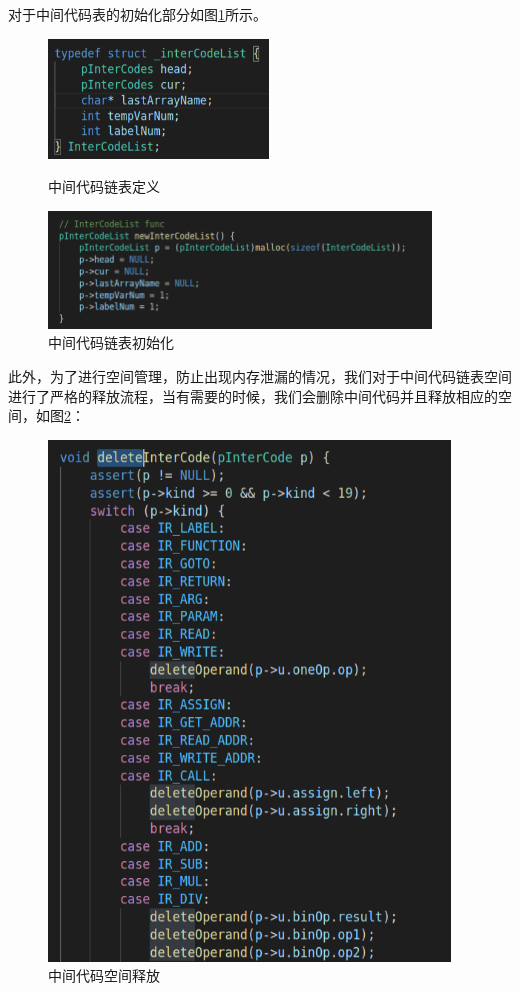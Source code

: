 \documentclass[lang=cn,11pt,a4paper,cite=authoryear]{elegantpaper}
\begin{document}
对于中间代码表的初始化部分如图\ref{pic2}所示。\par

\begin{figure}[htbp]
	\centering
	\begin{minipage}[t]{0.48\textwidth}
		\includegraphics[width=2.3in]{pics//p1.png}
		\caption{中间代码链表定义}
		\label{pic1}
	\end{minipage}
	\begin{minipage}[t]{0.48\textwidth}
		\includegraphics[width=4.0in]{pics//p2.png}
		\caption{中间代码链表初始化}
		\label{pic2}
	\end{minipage}
\end{figure}


此外，为了进行空间管理，防止出现内存泄漏的情况，我们对于中间代码链表空间进行了严格的释放流程，当有需要的时候，我们会删除中间代码并且释放相应的空间，如图\ref{pic3}：\par
\begin{figure}[h]
	\centering
	\includegraphics[width=4.2in]{pics//p3.png}
	\caption{中间代码空间释放}
	\label{pic3}
\end{figure}
\end{document}
